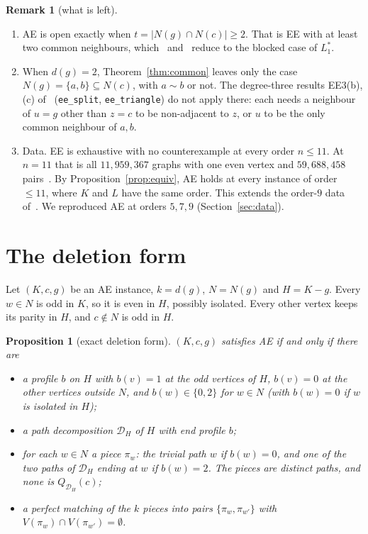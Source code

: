 \documentclass[11pt]{amsart}
\newtheorem{proposition}[theorem]{Proposition}
\theoremstyle{definition}
\newtheorem{remark}[theorem]{Remark}
\newcommand{\cD}{\mathcal D}
\begin{document}
\begin{remark}[what is left]\label{rem:left}
\begin{enumerate}[label=(\alph*)]
\item AE is open exactly when $t=|N(g)\cap N(c)|\ge2$. That is EE with at least two common
neighbours, which~\cite[Corollary~7.4]{PE} and~\cite[Corollary ``EE from the blocked case'']{L1S} reduce to the blocked case of
$L_1^*$.
\item When $d(g)=2$, Theorem~\ref{thm:common} leaves only the case $N(g)=\{a,b\}\subseteq N(c)$, with
$a\sim b$ or not. The degree-three results EE3(b), (c) of~\cite{MS} (\texttt{ee\_split},
\texttt{ee\_triangle}) do not apply there: each needs a neighbour of $u=g$ other than $z=c$ to be
non-adjacent to $z$, or $u$ to be the only common neighbour of $a,b$.
\item Data. EE is exhaustive with no counterexample at every order $n\le11$. At $n=11$ that is all
$11{,}959{,}367$ graphs with one even vertex and $59{,}688{,}458$ pairs~\cite{PE}. By
Proposition~\ref{prop:equiv}, AE holds at every instance of order $\le11$, where $K$ and $L$ have the
same order. This extends the order-$9$ data of~\cite{CR}. We reproduced AE at orders $5,7,9$
(Section~\ref{sec:data}).
\end{enumerate}
\end{remark}

\section{The deletion form}\label{sec:del}

Let $(K,c,g)$ be an AE instance, $k=d(g)$, $N=N(g)$ and $H=K-g$. Every $w\in N$ is odd in $K$, so
it is even in $H$, possibly isolated. Every other vertex keeps its parity in $H$, and $c\notin N$ is
odd in $H$.

\begin{proposition}[exact deletion form]\label{prop:del}
$(K,c,g)$ satisfies AE if and only if there are
\begin{itemize}
\item a profile $b$ on $H$ with $b(v)=1$ at the odd vertices of $H$, $b(v)=0$ at the other vertices
outside $N$, and $b(w)\in\{0,2\}$ for $w\in N$ (with $b(w)=0$ if $w$ is isolated in $H$);
\item a path decomposition $\cD_H$ of $H$ with end profile $b$;
\item for each $w\in N$ a \emph{piece} $\pi_w$: the trivial path $w$ if $b(w)=0$, and one of the two
paths of $\cD_H$ ending at $w$ if $b(w)=2$. The pieces are distinct paths, and none is
$Q_{\cD_H}(c)$;
\item a perfect matching of the $k$ pieces into pairs $\{\pi_w,\pi_{w'}\}$ with
$V(\pi_w)\cap V(\pi_{w'})=\emptyset$.
\end{itemize}
\end{proposition}
\end{document}
